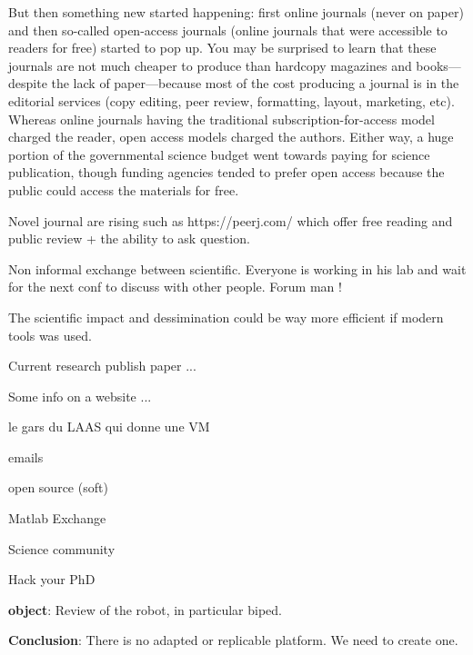 But then something new started happening: first online journals (never on paper) and then so-called open-access journals (online journals that were accessible to readers for free) started to pop up.
You may be surprised to learn that these journals are not much cheaper to produce than hardcopy magazines and books—despite the lack of paper—because most of the cost producing a journal is in the editorial services (copy editing, peer review, formatting, layout, marketing, etc).
Whereas online journals having the traditional subscription-for-access model charged the reader, open access models charged the authors.
Either way, a huge portion of the governmental science budget went towards paying for science publication, though funding agencies tended to prefer open access because the public could access the materials for free.

Novel journal are rising such as https://peerj.com/ which offer free reading and public review + the ability to ask question.

Non informal exchange between scientific.
Everyone is working in his lab and wait for the next conf to discuss with other people.
Forum man !

The scientific impact and dessimination could be way more efficient if modern tools was used.

Current research
publish paper ...

Some info on a website ...

le gars du LAAS qui donne une VM

emails

open source (soft)

Matlab Exchange

Science community

Hack your PhD


\textbf{object}: Review of the robot, in particular biped.


\textbf{Conclusion}: There is no adapted or replicable platform.
We need to create one.

